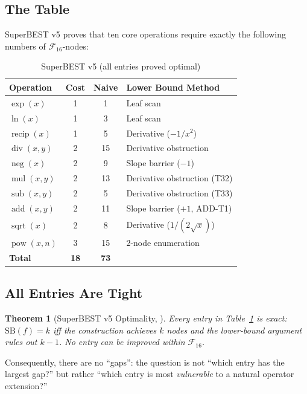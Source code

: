 \documentclass[12pt,a4paper]{article}
\newtheorem{theorem}{Theorem}[section]
\theoremstyle{definition}
\theoremstyle{remark}
\newcommand{\recip}{\operatorname{recip}}
\newcommand{\divop}{\operatorname{div}}
\newcommand{\mulop}{\operatorname{mul}}
\newcommand{\subop}{\operatorname{sub}}
\newcommand{\addop}{\operatorname{add}}
\newcommand{\negop}{\operatorname{neg}}
\newcommand{\powop}{\operatorname{pow}}
\newcommand{\sqrtop}{\operatorname{sqrt}}
\newcommand{\SB}{\mathrm{SB}}
\newcommand{\F}{\mathcal{F}_{16}}
\begin{document}
\subsection{The Table}

SuperBEST v5 \cite{SBv5} proves that ten core operations require exactly
the following numbers of $\F$-nodes:

\begin{table}[h]
\centering
\caption{SuperBEST v5 (all entries proved optimal)}
\label{tab:v5}
\begin{tabular}{@{}lccl@{}}
\toprule
\textbf{Operation} & \textbf{Cost} & \textbf{Naive} & \textbf{Lower Bound Method} \\
\midrule
$\exp(x)$        & 1 &  1 & Leaf scan \\
$\ln(x)$         & 1 &  3 & Leaf scan \\
$\recip(x)$      & 1 &  5 & Derivative ($-1/x^2$) \\
$\divop(x,y)$    & 2 & 15 & Derivative obstruction \\
$\negop(x)$      & 2 &  9 & Slope barrier ($-1$) \\
$\mulop(x,y)$    & 2 & 13 & Derivative obstruction (T32) \\
$\subop(x,y)$    & 2 &  5 & Derivative obstruction (T33) \\
$\addop(x,y)$    & 2 & 11 & Slope barrier ($+1$, ADD-T1) \\
$\sqrtop(x)$     & 2 &  8 & Derivative ($1/(2\sqrt{x})$) \\
$\powop(x,n)$    & 3 & 15 & 2-node enumeration \\
\midrule
\textbf{Total}   & \textbf{18} & \textbf{73} & \\
\bottomrule
\end{tabular}
\end{table}

\subsection{All Entries Are Tight}

\begin{theorem}[SuperBEST v5 Optimality, \cite{SBv5}]
Every entry in Table~\ref{tab:v5} is exact: $\SB(f) = k$ iff the
construction achieves $k$ nodes and the lower-bound argument rules out $k-1$.
No entry can be improved within $\F$.
\end{theorem}

Consequently, there are no ``gaps'': the question is not ``which entry has
the largest gap?'' but rather ``which entry is most \emph{vulnerable} to
a natural operator extension?''
\end{document}

